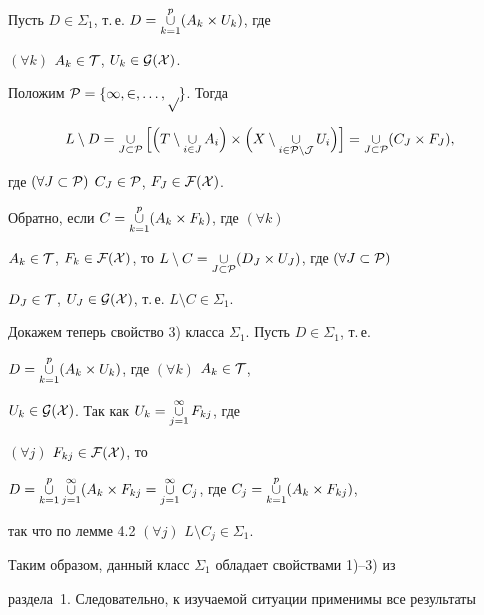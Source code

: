 \begin{pf} 


Пусть $D\in\Sigma_1$, т.\,е. $D=\mathop{\cup}\limits^p_{k=1}(A_k\times U_k)$, где 


$(\forall k)$ $A_k\in\cal T$, $U_k\in\cal G(X)$. 


Положим $\cal P=\{1,2,\dotsc,p\}$. Тогда 


$$ 


L\setminus D=\mycup_{J\subset\cal P}\Big[\Big(T\setminus 


\mycup_{i\in J}A_i\Big)\times\Big(X\setminus 


\mycup_{i\in\cal P\setminus J}U_i\Big)\Big]= 


\mycup_{J\subset\cal P}(C_J\times F_J), 


$$ 


где $(\forall J\subset\cal P)$ $C_J\in\cal P$, $F_J\in\cal F(X)$. 


 


Обратно, если $C=\mathop{\cup}\limits^p_{k=1}(A_k\times F_k)$, где $(\forall k)$ 


$A_k\in\cal T$, $F_k\in\cal F(X)$, то $L\setminus 


C=\mycup_{J\subset\cal P}(D_J\times U_J)$, где $(\forall J\subset\cal P)$ 


$D_J\in\cal T$, $U_J\in\cal G(X)$, т.\,е. $L\setminus C\in\Sigma_1$. 


\end{pf} 


 


Докажем теперь свойство 3) класса $\Sigma_1$. Пусть $D\in\Sigma_1$, т.\,е. 


$D=\mathop{\cup}\limits^p_{k=1}(A_k\times U_k)$, где $(\forall k)$ $A_k\in\cal T$, 


$U_k\in\cal G(X)$. Так как $U_k=\mathop{\cup}\limits^\infty_{j=1}F_{kj}$, где 


$(\forall j)$ $F_{kj}\in\cal F(X)$, то 


$D=\mycup^p_{k=1}\mycup^\infty_{j=1}(A_k\times F_{kj}= 


\mycup^\infty_{j=1}C_j$, где $C_j=\mycup^p_{k=1}(A_k\times F_{kj})$, 


так что по лемме 4.2 $(\forall j)$ $L\setminus C_j\in\Sigma_1$. 


 


Таким образом, данный класс $\Sigma_1$ обладает свойствами 1)--3) из 


раздела~1. Следовательно, к изучаемой ситуации применимы все результаты 


